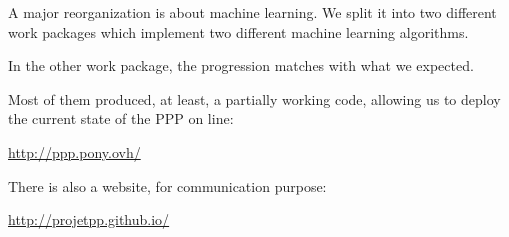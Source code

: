 A major reorganization is about machine learning. We split it into two different work packages which implement two different machine learning algorithms. 

In the other work package, the progression matches with what we expected.

Most of them produced, at least, a partially working code, allowing us to deploy the current state of the PPP on line:

\begin{center}
    \url{http://ppp.pony.ovh/}
\end{center}

There is also a website, for communication purpose:

\begin{center}
    \url{http://projetpp.github.io/}
\end{center}
